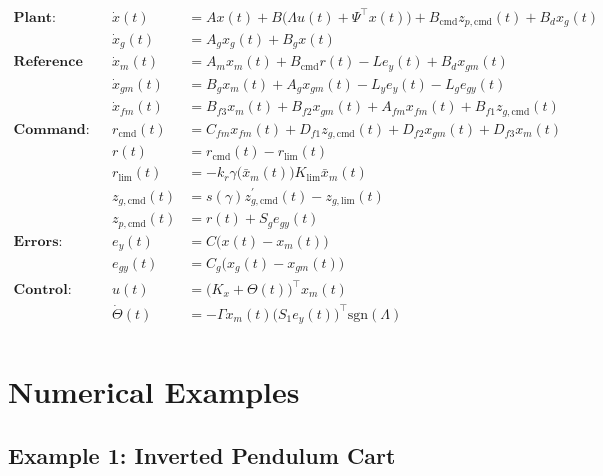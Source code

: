 \begin{equation*}
  \begin{aligned}
    \textbf{Plant:}
    && \dot{x}(t) &= Ax(t) + B\bigr(\Lambda u(t) + \Psi^{\top}x(t)\bigr) + B_{\text{cmd}}z_{p,\text{cmd}}(t) + B_{d}x_{g}(t) \\
    && \dot{x}_{g}(t) &= A_{g}x_{g}(t) + B_{g}x(t) \\
    \textbf{Reference model:}
    && \dot{x}_{m}(t) &= A_{m}x_{m}(t) + B_{\text{cmd}}r(t) - Le_{y}(t) + B_{d}x_{gm}(t) \\
    && \dot{x}_{gm}(t) &= B_{g}x_{m}(t) + A_{g}x_{gm}(t) - L_{y}e_{y}(t) - L_{g}e_{gy}(t) \\
    && \dot{x}_{fm}(t) &= B_{f3}x_{m}(t) + B_{f2}x_{gm}(t) + A_{fm}x_{fm}(t) + B_{f1}z_{g,\text{cmd}}(t) \\
    \textbf{Command:}
    && r_{\text{cmd}}(t) &= C_{fm}x_{fm}(t) + D_{f1}z_{g,\text{cmd}}(t) + D_{f2}x_{gm}(t) + D_{f3} x_{m}(t) \\
    && r(t) &= r_{\text{cmd}}(t) - r_{\text{lim}}(t) \\
    && r_{\text{lim}}(t) &= -k_{r}\gamma\bigr(\bar{x}_{m}(t)\bigr) K_{\text{lim}}\bar{x}_{m}(t) \\
    && z_{g,\text{cmd}}(t) &= s(\gamma)z_{g,\text{cmd}}^{\prime}(t) - z_{g,\text{lim}}(t) \\
    && z_{p,\text{cmd}}(t) &= r(t) + S_{g}e_{gy}(t) \\
    \textbf{Errors:}
    && e_{y}(t) &= C\bigr(x(t)-x_{m}(t)\bigr) \\
    && e_{gy}(t) &= C_{g}\bigr(x_{g}(t) - x_{gm}(t)\bigr) \\
    \textbf{Control:}
    && u(t) &= \bigr(K_{x}+\Theta(t)\bigr)^{\top}x_{m}(t) \\
    && \dot{\Theta}(t) &= -\Gamma x_{m}(t)\bigr(S_{1}e_{y}(t)\bigr)^{\top}\text{sgn}(\Lambda) \\
  \end{aligned}
\end{equation*}

\section{Numerical Examples}\label{sec.outerLoopNumericalExample}

\subsection{Example 1: Inverted Pendulum Cart}

